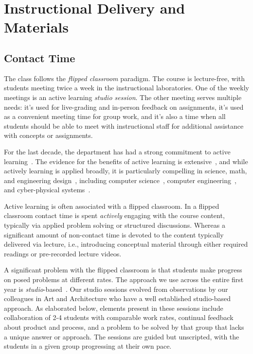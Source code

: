 \section{Instructional Delivery and Materials}
\label{sec:delivery}

\subsection{Contact Time}

The class follows the \emph{flipped classroom} paradigm.  The course is lecture-free, with students meeting twice a week in the instructional laboratories.   One of the weekly meetings is an active learning \emph{studio session}.  The other meeting serves multiple needs: it's used for live-grading and in-person feedback on assignments, it's used as a convenient meeting time for group work, and it's also a time when all students should be able to meet with instructional staff for additional assistance with concepts or assignments.

For the last decade, the department has had a strong commitment to active learning~\cite{scbggg10,sgcggt10}. The evidence for the benefits of active learning is extensive~\cite{jjs98,lst99,Prince04,rss97}, and while actively learning is applied broadly, it is particularly compelling in science, math, and engineering design~\cite{Freeman14,lst99,Hake98,Byerley01,kb06}, including computer science~\cite{McConnell96,tlb01,skltc10,ag13}, computer engineering~\cite{hmdpa04,sr02}, and cyber-physical systems~\cite{me14,mmy16}.

Active learning is often associated with a flipped classroom.  In a flipped classroom contact time is spent \emph{actively} engaging with the course content, typically via applied problem solving or structured discussions. Whereas a significant amount of non-contact time is devoted to the content typically delivered via lecture, i.e., introducing conceptual material through either required readings or pre-recorded lecture videos.

A significant problem with the flipped classroom is that students make progress on posed problems at different rates. The approach we use across the entire first year is \emph{studio}-based~\cite{hnc08}. Our studio sessions evolved from observations by our colleagues in Art and Architecture who have a well established studio-based approach.  As elaborated below, elements present in these sessions include collaboration of 2-4 students with comparable work rates, continual feedback about product and process, and a problem to be solved by that group that lacks a unique answer or approach.  The sessions are guided but unscripted, with the students in a given group progressing at their own pace.

